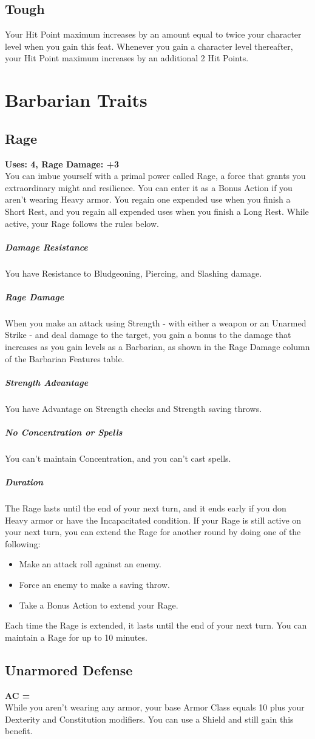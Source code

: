 \documentclass[letterpaper,openany,oneside,twocolumn]{book}
\begin{document}
\subsection*{Tough}
Your Hit Point maximum increases by an amount equal to twice your character level when you gain this feat. Whenever you gain a character level thereafter, your Hit Point maximum increases by an additional 2 Hit Points.

\section*{Barbarian Traits}
\subsection*{Rage}
\textbf{Uses: 4, Rage Damage: +3}\\
You can imbue yourself with a primal power called Rage, a force that grants you extraordinary might and resilience. You can enter it as a Bonus Action if you aren't wearing Heavy armor.
You regain one expended use when you finish a Short Rest, and you regain all expended uses when you finish a Long Rest.
While active, your Rage follows the rules below.
\subparagraph*{Damage Resistance} You have Resistance to Bludgeoning, Piercing, and Slashing damage.
\subparagraph*{Rage Damage} When you make an attack using Strength - with either a weapon or an Unarmed Strike - and deal damage to the target, you gain a bonus to the damage that increases as you gain levels as a Barbarian, as shown in the Rage Damage column of the Barbarian Features table.
\subparagraph*{Strength Advantage} You have Advantage on Strength checks and Strength saving throws.
\subparagraph*{No Concentration or Spells} You can't maintain Concentration, and you can't cast spells.
\subparagraph*{Duration} The Rage lasts until the end of your next turn, and it ends early if you don Heavy armor or have the Incapacitated condition. If your Rage is still active on your next turn, you can extend the Rage for another round by doing one of the following:
\begin{itemize}
	\item Make an attack roll against an enemy.
	\item Force an enemy to make a saving throw.
	\item Take a Bonus Action to extend your Rage.
\end{itemize}
Each time the Rage is extended, it lasts until the end of your next turn. You can maintain a Rage for up to 10 minutes.
\subsection*{Unarmored Defense}
\textbf{AC = }\\
While you aren't wearing any armor, your base Armor Class equals 10 plus your Dexterity and Constitution modifiers. You can use a Shield and still gain this benefit.
\end{document}
